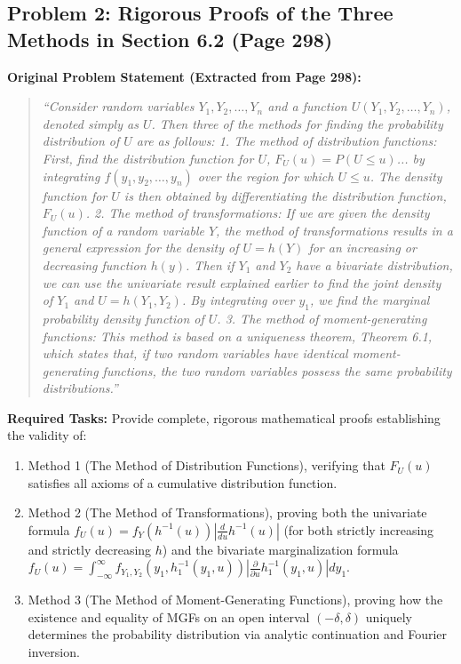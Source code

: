 \documentclass[11pt, letterpaper]{article}
\theoremstyle{definition}
\theoremstyle{remark}
\begin{document}
\subsection{Problem 2: Rigorous Proofs of the Three Methods in Section 6.2 (Page 298)}

\textbf{Original Problem Statement (Extracted from Page 298):}
\begin{quote}
\textit{``Consider random variables $Y_1, Y_2, \dots, Y_n$ and a function $U(Y_1, Y_2, \dots, Y_n)$, denoted simply as $U$. Then three of the methods for finding the probability distribution of $U$ are as follows:
1. The method of distribution functions: First, find the distribution function for $U$, $F_U(u) = P(U \le u)$... by integrating $f(y_1, y_2, \dots, y_n)$ over the region for which $U \le u$. The density function for $U$ is then obtained by differentiating the distribution function, $F_U(u)$.
2. The method of transformations: If we are given the density function of a random variable $Y$, the method of transformations results in a general expression for the density of $U = h(Y)$ for an increasing or decreasing function $h(y)$. Then if $Y_1$ and $Y_2$ have a bivariate distribution, we can use the univariate result explained earlier to find the joint density of $Y_1$ and $U = h(Y_1, Y_2)$. By integrating over $y_1$, we find the marginal probability density function of $U$.
3. The method of moment-generating functions: This method is based on a uniqueness theorem, Theorem 6.1, which states that, if two random variables have identical moment-generating functions, the two random variables possess the same probability distributions.''}
\end{quote}

\textbf{Required Tasks:}
Provide complete, rigorous mathematical proofs establishing the validity of:
\begin{enumerate}[label=(\alph*)]
    \item Method 1 (The Method of Distribution Functions), verifying that $F_U(u)$ satisfies all axioms of a cumulative distribution function.
    \item Method 2 (The Method of Transformations), proving both the univariate formula $f_U(u) = f_Y(h^{-1}(u)) \left|\frac{d}{du}h^{-1}(u)\right|$ (for both strictly increasing and strictly decreasing $h$) and the bivariate marginalization formula $f_U(u) = \int_{-\infty}^\infty f_{Y_1, Y_2}(y_1, h_1^{-1}(y_1, u)) \left|\frac{\partial}{\partial u}h_1^{-1}(y_1, u)\right| dy_1$.
    \item Method 3 (The Method of Moment-Generating Functions), proving how the existence and equality of MGFs on an open interval $(-\delta, \delta)$ uniquely determines the probability distribution via analytic continuation and Fourier inversion.
\end{enumerate}
\end{document}
